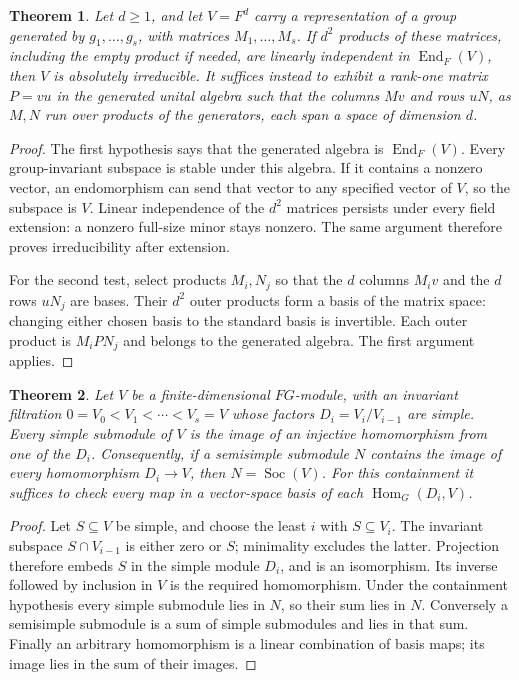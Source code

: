 \documentclass[11pt,a4paper]{article}
\newtheorem{theorem}{Theorem}[section]
\numberwithin{equation}{section}
\begin{document}
\begin{theorem}\label{ULCD.MatrixAlgebra}
Let $d\geq1$, and let $V=F^d$ carry a representation of a group generated by
$g_1,\ldots,g_s$, with matrices $M_1,\ldots,M_s$.
If $d^2$ products of these matrices, including the empty product if needed,
are linearly independent in $\operatorname{End}_F(V)$, then $V$ is
absolutely irreducible.
It suffices instead to exhibit a rank-one matrix $P=vu$ in the generated
unital algebra such that the columns $Mv$ and rows $uN$, as $M,N$ run
over products of the generators, each span a space of dimension $d$.
\end{theorem}
\begin{proof}
The first hypothesis says that the generated algebra is
$\operatorname{End}_F(V)$. Every group-invariant subspace is stable under
this algebra. If it contains a nonzero vector, an endomorphism can send
that vector to any specified vector of $V$, so the subspace is $V$.
Linear independence of the $d^2$ matrices persists under every field
extension: a nonzero full-size minor stays nonzero. The same argument
therefore proves irreducibility after extension.

For the second test, select products $M_i,N_j$ so that the $d$ columns
$M_iv$ and the $d$ rows $uN_j$ are bases. Their $d^2$ outer products
form a basis of the matrix space: changing either chosen basis to the
standard basis is invertible. Each outer product is $M_iPN_j$ and belongs
to the generated algebra. The first argument applies.
\end{proof}

\begin{theorem}\label{ULCD.Socle}
Let $V$ be a finite-dimensional $FG$-module, with an invariant filtration
$0=V_0<V_1<\cdots<V_s=V$ whose factors $D_i=V_i/V_{i-1}$ are simple.
Every simple submodule of $V$ is the image of an injective homomorphism
from one of the $D_i$. Consequently, if a semisimple submodule $N$ contains
the image of every homomorphism $D_i\to V$, then $N=\operatorname{Soc}(V)$.
For this containment it suffices to check every map in a vector-space
basis of each $\operatorname{Hom}_G(D_i,V)$.
\end{theorem}
\begin{proof}
Let $S\subseteq V$ be simple, and choose the least $i$ with $S\subseteq V_i$.
The invariant subspace $S\cap V_{i-1}$ is either zero or $S$; minimality
excludes the latter. Projection therefore embeds $S$ in the simple module
$D_i$, and is an isomorphism. Its inverse followed by inclusion in $V$
is the required homomorphism. Under the containment hypothesis every
simple submodule lies in $N$, so their sum lies in $N$. Conversely a
semisimple submodule is a sum of simple submodules and lies in that sum.
Finally an arbitrary homomorphism is a linear combination of basis maps;
its image lies in the sum of their images.
\end{proof}
\end{document}
